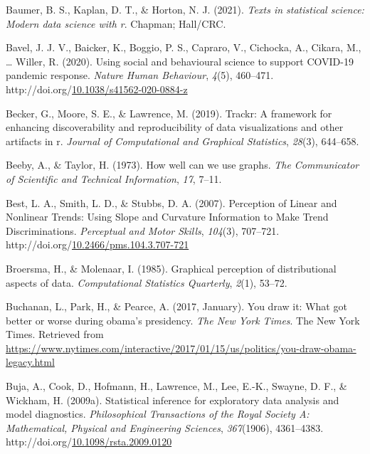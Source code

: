 \documentclass[print]{nuthesis}
\newlength{\cslhangindent}
\newenvironment{CSLReferences}[2]%
{\setlength{\parindent}{0pt}%
\everypar{\setlength{\hangindent}{\cslhangindent}}\ignorespaces}%
{\par}
\begin{document}
\begin{CSLReferences}{1}{0}
\leavevmode{}%
Baumer, B. S., Kaplan, D. T., \& Horton, N. J. (2021). \emph{Texts in statistical science: Modern data science with r}. Chapman; Hall/CRC.

\leavevmode{}%
Bavel, J. J. V., Baicker, K., Boggio, P. S., Capraro, V., Cichocka, A., Cikara, M., \ldots{} Willer, R. (2020). Using social and behavioural science to support {COVID}-19 pandemic response. \emph{Nature Human Behaviour}, \emph{4}(5), 460--471. http://doi.org/\href{https://doi.org/10.1038/s41562-020-0884-z}{10.1038/s41562-020-0884-z}

\leavevmode{}%
Becker, G., Moore, S. E., \& Lawrence, M. (2019). Trackr: A framework for enhancing discoverability and reproducibility of data visualizations and other artifacts in r. \emph{Journal of Computational and Graphical Statistics}, \emph{28}(3), 644--658.

\leavevmode{}%
Beeby, A., \& Taylor, H. (1973). How well can we use graphs. \emph{The Communicator of Scientific and Technical Information}, \emph{17}, 7--11.

\leavevmode{}%
Best, L. A., Smith, L. D., \& Stubbs, D. A. (2007). Perception of {Linear} and {Nonlinear} {Trends}: {Using} {Slope} and {Curvature} {Information} to {Make} {Trend} {Discriminations}. \emph{Perceptual and Motor Skills}, \emph{104}(3), 707--721. http://doi.org/\href{https://doi.org/10.2466/pms.104.3.707-721}{10.2466/pms.104.3.707-721}

\leavevmode{}%
Broersma, H., \& Molenaar, I. (1985). Graphical perception of distributional aspects of data. \emph{Computational Statistics Quarterly}, \emph{2}(1), 53--72.

\leavevmode{}%
Buchanan, L., Park, H., \& Pearce, A. (2017, January). You draw it: What got better or worse during obama's presidency. \emph{The New York Times}. The New York Times. Retrieved from \url{https://www.nytimes.com/interactive/2017/01/15/us/politics/you-draw-obama-legacy.html}

\leavevmode{}%
Buja, A., Cook, D., Hofmann, H., Lawrence, M., Lee, E.-K., Swayne, D. F., \& Wickham, H. (2009a). Statistical inference for exploratory data analysis and model diagnostics. \emph{Philosophical Transactions of the Royal Society A: Mathematical, Physical and Engineering Sciences}, \emph{367}(1906), 4361--4383. http://doi.org/\href{https://doi.org/10.1098/rsta.2009.0120}{10.1098/rsta.2009.0120}


\end{CSLReferences}
\end{document}
